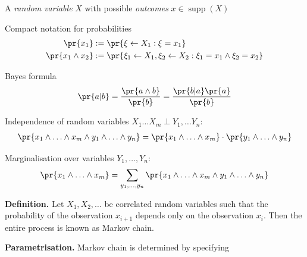 \documentclass[landscape,footrule]{foils}
\DeclareMathOperator{\supp}{supp}
\begin{document}

\enlargethispage{0.9cm}
\begin{triangles}
\item A \emph{random variable} $X$ with possible \emph{outcomes} $x\in\supp(X)$
\item Compact notation for probabilities \vspace*{-1ex}
\begin{align*}
\pr{x_1}&:=\pr{\xi\gets X_1: \xi=x_1}\\
\pr{x_1\wedge x_2}&:=\pr{\xi_1\gets X_1,\xi_2\gets X_2 : \xi_1=x_1\wedge \xi_2=x_2}
\end{align*}\vspace*{-4ex}
\item Bayes formula \vspace*{-2ex}
\begin{align*}
\pr{a|b}=\frac{\pr{a\wedge b}}{\pr{b}}=\frac{\pr{b|a}\pr{a}}{\pr{b}}
\end{align*}\vspace*{-4ex}
\item Independence of random variables $X_1\ldots X_m\perp Y_1,\ldots Y_n$: \vspace*{-1ex}
\begin{align*}
 \pr{x_1\wedge\ldots\wedge x_m\wedge y_1\wedge\ldots\wedge y_n}=\pr{x_1\wedge\ldots\wedge x_m}\cdot\pr{y_1\wedge\ldots\wedge y_n}
\end{align*}\vspace*{-4ex}
\item Marginalisation over variables $Y_1,\ldots, Y_n$: \vspace*{-1ex}
\begin{align*}
 \pr{x_1\wedge\ldots\wedge x_m}=\sum_{y_1,\ldots,y_n}\pr{x_1\wedge\ldots\wedge x_m \wedge y_1\wedge\ldots\wedge y_n}
\end{align*} 
\end{triangles}



\textbf{Definition.}
Let $X_1, X_2,\ldots$ be correlated random variables such that the probability of the observation $x_{i+1}$ depends only on the observation $x_{i}$.
Then the entire process is known as Markov chain.

\vspace*{1cm}

\textbf{Parametrisation.}
Markov chain is determined by specifying 
\end{document}
